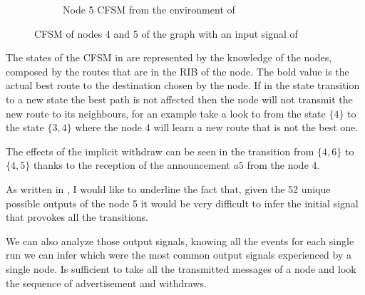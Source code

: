 \begin{figure}[h]
\begin{subfigure}[b]{0.45\textwidth}
		 \caption{Node \num{5} \ac{CFSM} from the environment of }
         \label{fig:fsm_node5}
     \end{subfigure}
		\caption{\ac{CFSM} of nodes \num{4} and \num{5} of the graph
			 with an input signal of 
			}
        \label{fig:fsm_griffin_fig4}
\end{figure}

The states of the \ac{CFSM} in  are represented by the
knowledge of the nodes, composed by the routes that are in the \ac{RIB} of the node.
The bold value is the actual best route to the destination chosen by the node.
If in the state transition to a new state the best path is not affected then the
node will not transmit the new route to its neighbours, for an example take
a look to  from the state $\{4\}$ to the state $\{3, 4\}$
where the node \num{4} will learn a new route that is not the best one.

The effects of the implicit withdraw can be seen in 
the transition from $\{4, 6\}$ to $\{4, 5\}$ thanks to the reception of the
announcement $a5$ from the node \num{4}.

As written in \cite{griffinFSM}, I would like to underline the fact that, given
the \num{52} unique possible outputs of the node \num{5} it would be very difficult
to infer the initial signal that provokes all the transitions.

We can also analyze those output signals, knowing all the events for each single
run we can infer which were the most common output signals experienced by a single node.
Is sufficient to take all the transmitted messages of a node and look the sequence
of advertisement and withdraws.

